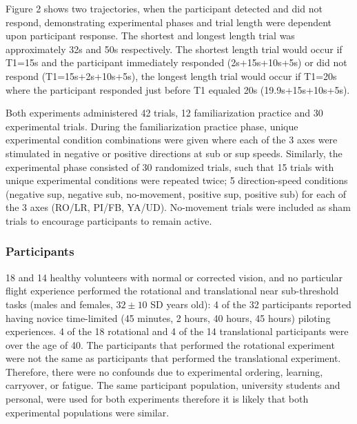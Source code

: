 \documentclass[11pt, onecolumn]{article}
\begin{document}
Figure 2 shows two trajectories, when the participant detected and did not respond, demonstrating 
experimental phases and trial length were dependent upon participant response.  The shortest and longest length trial was approximately 32s and 50s respectively.  The shortest length trial would occur if T1=15s and the participant immediately responded (2s+15s+10s+5s) or did not respond  (T1=15s+2s+10s+5s), the longest length trial would occur if T1=20s where the participant responded just before T1 equaled 20s (19.9s+15s+10s+5s).

Both experiments administered 42 trials, 12 familiarization practice and 30 experimental trials.  During the familiarization practice phase, unique experimental condition combinations were given where each of the 3 axes were stimulated in negative or positive directions at sub or sup speeds.  Similarly, the experimental phase consisted of 30 randomized trials, such that 15 trials with unique experimental conditions were repeated twice; 5 direction-speed conditions (negative sup, negative sub, no-movement, positive sup, positive sub) for each of the 3 axes (RO/LR, PI/FB, YA/UD).  No-movement trials were included as sham trials to encourage participants to remain active.

\subsubsection{Participants}
18 and 14 healthy volunteers with normal or corrected vision, and no particular flight experience performed the rotational and translational near sub-threshold tasks (males and females, $32\pm10$ SD years old): 4 of the 32 participants reported having novice time-limited (45 minutes, 2 hours, 40 hours, 45 hours) piloting experiences. 4 of the 18 rotational and 4 of the 14 translational participants were over the age of 40. The participants that performed the rotational experiment were not the same as participants that performed the translational experiment. Therefore, there were no confounds due to experimental ordering, learning, carryover, or fatigue. The same participant population, university students and personal, were used for both experiments therefore it is likely that both experimental populations were similar. 
\end{document}
